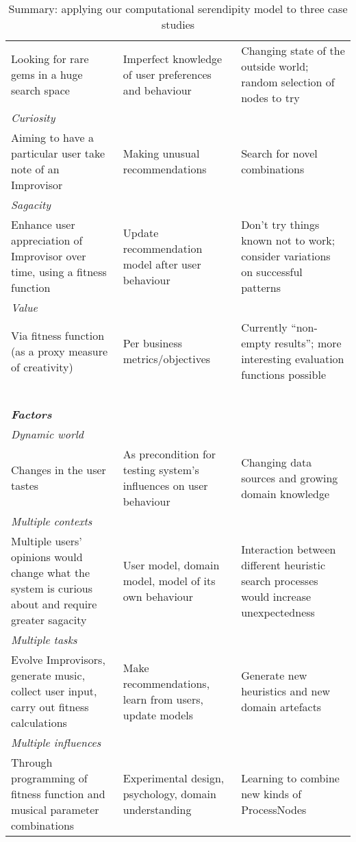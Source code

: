 \begin{table}[p]
{\begin{tabular}{p{1.5in}@{\hspace{.1in}}p{1.5in}@{\hspace{.1in}}p{1.5in}}
Looking for rare gems in a huge search space
& Imperfect knowledge of user preferences and behaviour
& Changing state of the outside world; random selection of nodes to try \\
\multicolumn{3}{l}{\em Curiosity} \\[-.1cm]
Aiming to have a particular user take note of an Improvisor
& Making unusual recommendations
& Search for novel combinations \\
\multicolumn{3}{l}{\em Sagacity} \\[-.1cm]
Enhance user appreciation of Improvisor over time,
using a fitness function
& Update recommendation model after user behaviour 
& Don't try things known not to work; consider variations on successful patterns \\
\multicolumn{3}{l}{\em Value} \\[-.1cm]
Via fitness function (as a proxy measure of creativity)
& Per business metrics/objectives
& Currently ``non-empty results''; more interesting evaluation functions possible \\
\cline{1-3}
~\\[-.1cm]
\multicolumn{3}{l}{\em \textbf{Factors}} \\
\cline{1-3}
\multicolumn{3}{l}{\em Dynamic world} \\[-.1cm]
Changes in the user tastes
& As precondition for testing system's influences on user behaviour
& Changing data sources and growing domain knowledge \\
\multicolumn{3}{l}{\em Multiple contexts} \\[-.1cm]
Multiple users' opinions would change what the system is curious about and require greater sagacity
& User model, domain model, model of its own behaviour
& Interaction between different heuristic search processes would increase unexpectedness \\
\multicolumn{3}{l}{\em Multiple tasks} \\[-.1cm]
Evolve Improvisors, generate music, collect user input, carry out fitness calculations
& Make recommendations, learn from users, update models
& Generate new heuristics and new domain artefacts \\
\multicolumn{3}{l}{\em Multiple influences} \\[-.1cm]
Through programming of fitness function and musical parameter combinations
& Experimental design, psychology, domain understanding
& Learning to combine new kinds of ProcessNodes\\
\cline{1-3}
\end{tabular}
\par}
\normalsize
\bigskip

\caption{Summary: applying our computational serendipity model to three case studies\label{caseStudies}}
\end{table}

